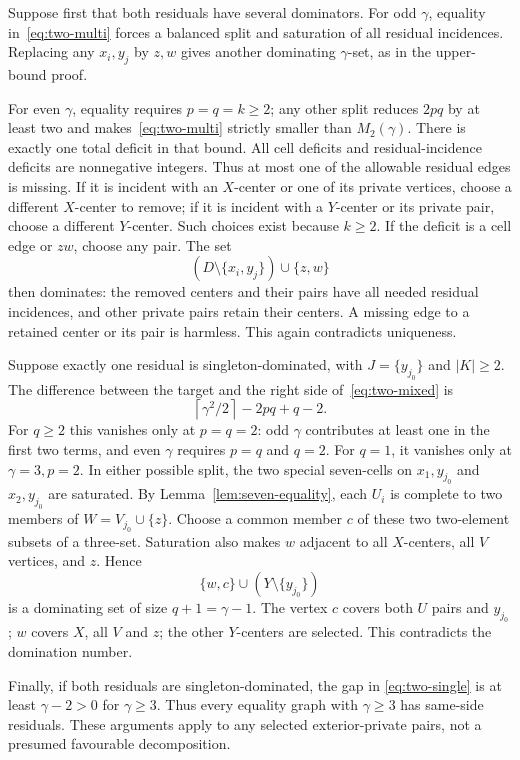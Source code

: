 \documentclass[11pt]{article}
\theoremstyle{definition}
\theoremstyle{remark}
\newcommand{\ceil}[1]{\left\lceil#1\right\rceil}
\begin{document}
Suppose first that both residuals have several dominators. For odd $\gamma$,
equality in~\eqref{eq:two-multi} forces a balanced split and saturation of
all residual incidences. Replacing any $x_i,y_j$ by $z,w$ gives another
dominating $\gamma$-set, as in the upper-bound proof.

For even $\gamma$, equality requires $p=q=k\ge2$; any other split reduces
$2pq$ by at least two and makes~\eqref{eq:two-multi} strictly smaller than
$M_2(\gamma)$. There is exactly one total deficit in that bound. All
cell deficits and residual-incidence deficits are nonnegative integers.
Thus at most one of the allowable residual edges is missing.
If it is incident with an $X$-center or one of its private vertices,
choose a different $X$-center to remove; if it is incident with a
$Y$-center or its private pair, choose a different $Y$-center. Such
choices exist because $k\ge2$. If the deficit is a cell edge or $zw$,
choose any pair. The set
\[
 (D\setminus\{x_i,y_j\})\cup\{z,w\}
\]
then dominates: the removed centers and their pairs have all needed
residual incidences, and other private pairs retain their centers.
A missing edge to a retained center or its pair is harmless. This again
contradicts uniqueness.

Suppose exactly one residual is singleton-dominated, with
$J=\{y_{j_0}\}$ and $|K|\ge2$. The difference between the target and the
right side of~\eqref{eq:two-mixed} is
\[
 \ceil{\gamma^2/2}-2pq+q-2.
\]
For $q\ge2$ this vanishes only at $p=q=2$: odd $\gamma$ contributes at
least one in the first two terms, and even $\gamma$ requires $p=q$ and
$q=2$. For $q=1$, it vanishes only at $\gamma=3,p=2$.
In either possible split, the two special seven-cells on $x_1,y_{j_0}$
and $x_2,y_{j_0}$ are saturated. By Lemma~\ref{lem:seven-equality}, each
$U_i$ is complete to two members of $W=V_{j_0}\cup\{z\}$.
Choose a common member $c$ of these two two-element subsets of a three-set.
Saturation also makes $w$ adjacent to all $X$-centers, all $V$ vertices,
and $z$. Hence
\[
 \{w,c\}\cup(Y\setminus\{y_{j_0}\})
\]
is a dominating set of size $q+1=\gamma-1$. The vertex $c$ covers both
$U$ pairs and $y_{j_0}$; $w$ covers $X$, all $V$ and $z$; the other
$Y$-centers are selected. This contradicts the domination number.

Finally, if both residuals are singleton-dominated, the gap in
\eqref{eq:two-single} is at least $\gamma-2>0$ for $\gamma\ge3$.
Thus every equality graph with $\gamma\ge3$ has same-side residuals.
These arguments apply to any selected exterior-private pairs, not a
presumed favourable decomposition.
\end{document}
